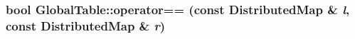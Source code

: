 \label{namespace_global_table_ac8a24b85b1754afdfff19e408825f22c}
\hypertarget{namespace_global_table_a6c903e747c42db36608f8a7c47012f7e}{
\subsubsection[{operator==}]{\setlength{\rightskip}{0pt plus 5cm}bool GlobalTable::operator== (const DistributedMap \& {\em l}, \/  const DistributedMap \& {\em r})}}
\label{namespace_global_table_a6c903e747c42db36608f8a7c47012f7e}
